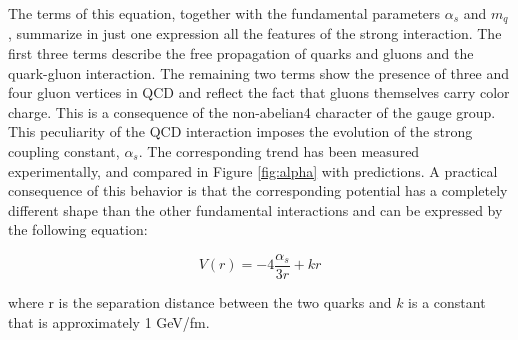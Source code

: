 The terms of this equation, together with the fundamental parameters $\alpha_{s}$ and $m_{q}$, summarize in just one expression all the features of the strong interaction. 
The first three terms describe the free propagation of quarks and gluons and the quark-gluon interaction. The remaining two terms show the presence of three and four gluon vertices in QCD and reflect the fact that gluons themselves carry color charge. This is a consequence of the non-abelian4 character of the gauge group.
This peculiarity of the QCD interaction imposes the evolution of the strong coupling constant, $\alpha_{s}$. The corresponding trend has been measured experimentally, and compared in Figure \ref{fig:alpha} with predictions. A practical consequence of this behavior is that the corresponding potential has a completely different shape than the other fundamental interactions and can be expressed by the following equation:


\begin{equation}\label{label:potential}
V(r) = -4\frac{\alpha_{s}}{3r} + kr
\end{equation}

where r is the separation distance between the two quarks and $k$ is a constant that is approximately 1 GeV/fm. %

